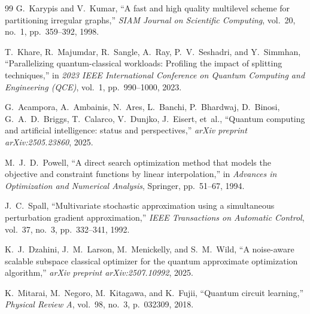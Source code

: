 \documentclass[11pt,a4paper]{article}
\begin{document}
\vspace{1.5em}
\begin{thebibliography}{99}
G.~Karypis and V.~Kumar, ``A fast and high quality multilevel scheme for partitioning irregular graphs,'' \emph{SIAM Journal on Scientific Computing}, vol.~20, no.~1, pp.~359--392, 1998.

T.~Khare, R.~Majumdar, R.~Sangle, A.~Ray, P.~V.~Seshadri, and Y.~Simmhan, ``Parallelizing quantum-classical workloads: Profiling the impact of splitting techniques,'' in \emph{2023 IEEE International Conference on Quantum Computing and Engineering (QCE)}, vol.~1, pp.~990--1000, 2023.

G.~Acampora, A.~Ambainis, N.~Ares, L.~Banchi, P.~Bhardwaj, D.~Binosi, G.~A.~D.~Briggs, T.~Calarco, V.~Dunjko, J.~Eisert, et~al., ``Quantum computing and artificial intelligence: status and perspectives,'' \emph{arXiv preprint arXiv:2505.23860}, 2025.

M.~J.~D.~Powell, ``A direct search optimization method that models the objective and constraint functions by linear interpolation,'' in \emph{Advances in Optimization and Numerical Analysis}, Springer, pp.~51--67, 1994.

J.~C.~Spall, ``Multivariate stochastic approximation using a simultaneous perturbation gradient approximation,'' \emph{IEEE Transactions on Automatic Control}, vol.~37, no.~3, pp.~332--341, 1992.

K.~J.~Dzahini, J.~M.~Larson, M.~Menickelly, and S.~M.~Wild, ``A noise-aware scalable subspace classical optimizer for the quantum approximate optimization algorithm,'' \emph{arXiv preprint arXiv:2507.10992}, 2025.

K.~Mitarai, M.~Negoro, M.~Kitagawa, and K.~Fujii, ``Quantum circuit learning,'' \emph{Physical Review A}, vol.~98, no.~3, p.~032309, 2018.
\end{thebibliography}
\end{document}
